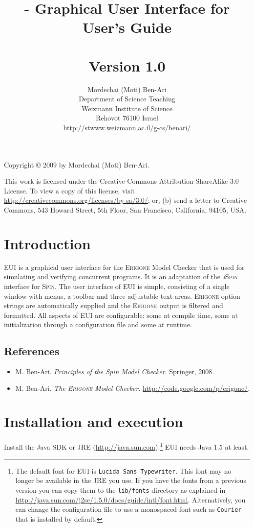 \documentclass[11pt]{article}
\title{\eui{} - Graphical User Interface for \eri{}\\User's Guide\\\mbox{}\\\large{Version 1.0}}
\author{Mordechai (Moti) Ben-Ari\\
Department of Science Teaching\\
Weizmann Institute of Science\\
Rehovot 76100 Israel\\
\textsf{http://stwww.weizmann.ac.il/g-cs/benari/}}
\newcommand{\spn}{\textsc{Spin}}
\newcommand{\eri}{\textsc{Erigone}}
\newcommand{\eui}{\textsc{EUI}}
\newcommand{\p}[1]{\texttt{#1}}
\begin{document}
\maketitle
\thispagestyle{empty}

\vfill

\begin{center}
Copyright \copyright{} 2009 by Mordechai (Moti) Ben-Ari.
\end{center}

This work is licensed under the Creative Commons Attribution-ShareAlike 3.0
License. To view a copy of this license, visit
\url{http://creativecommons.org/licenses/by-sa/3.0/}; or, (b) send a letter
to Creative Commons, 543 Howard Street, 5th Floor, San Francisco,
California, 94105, USA.

\newpage

\section{Introduction}

\eui{} is a graphical user interface for the \eri{} Model Checker that is
used for simulating and verifying concurrent programs. It is an adaptation
of the \textsc{jSpin} interface for \spn{}.
The user interface of \eui{} is simple, consisting of a single window
with menus, a toolbar and three adjustable text areas. \eri{} option
strings are automatically supplied and the \eri{} output is filtered and
formatted. All aspects of \eui{} are configurable: some at compile time,
some at initialization through a configuration file and some at runtime.

\subsection*{References}
\begin{itemize}
\item M. Ben-Ari. \textit{Principles of the Spin Model Checker}. Springer, 2008.
\item M. Ben-Ari. \textit{The \eri{} Model Checker}. \url{http://code.google.com/p/erigone/}.
\end{itemize}

\section{Installation and execution}
Install the Java SDK or JRE (\url{http://java.sun.com}).\footnote{The
default font for \eui{} is \p{Lucida Sans Typewriter}. This font may no longer be
available in the JRE you use. If you have the fonts from a previous version you
can copy them to the \p{lib/fonts} directory as explained in
\url{http://java.sun.com/j2se/1.5.0/docs/guide/intl/font.html}. Alternatively,
you can change the configuration file to use a monospaced font such as
\p{Courier} that is installed by default.} \eui{} needs Java 1.5 at least.
\end{document}
